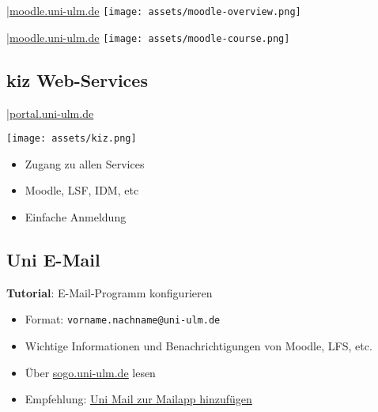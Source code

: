 \documentclass[
	aspectratio=169, 
	8pt 
]{beamer}
\begin{document}
\begin{frame}{\insertsubsection \space|\space\underline{\href{https://moodle.uni-ulm.de}{moodle.uni-ulm.de}}}
    \texttt{[image: assets/moodle-overview.png]}
\end{frame}

\begin{frame}{\insertsubsection \space|\space\underline{\href{https://moodle.uni-ulm.de}{moodle.uni-ulm.de}}}
    \texttt{[image: assets/moodle-course.png]}
\end{frame}


\subsection{kiz Web-Services}
\begin{frame}{\insertsubsection \space|\space\underline{\href{https://portal.uni-ulm.de}{portal.uni-ulm.de}}}
    \begin{fancycolumns}[widths={60}]
        \texttt{[image: assets/kiz.png]}
        \nextcolumn
        \begin{itemize}
            \item Zugang zu allen Services
            \item Moodle, LSF, IDM, etc
            \item Einfache Anmeldung 
        \end{itemize}
    \end{fancycolumns}
\end{frame}

\subsection{Uni E-Mail}
\begin{frame}{\insertsubsection}
    \begin{fancycolumns}[T, widths={30}]
        \begin{center}
            \textbf{Tutorial}: E-Mail-Programm konfigurieren
        \end{center}    
        \nextcolumn
        \begin{itemize}
            \item Format: \lstinline|vorname.nachname@uni-ulm.de|
            \item Wichtige Informationen und Benachrichtigungen von Moodle, LFS, etc.
            \item Über \underline{\href{https://sogo.uni-ulm.de}{sogo.uni-ulm.de}} lesen
            \item Empfehlung: \underline{\href{https://www.uni-ulm.de/einrichtungen/kiz/service-katalog/e-mail-kalender-zusammenarbeit/e-mail/e-mail-programme-konfigurieren/}{Uni Mail zur Mailapp hinzufügen}}
        \end{itemize}
    \end{fancycolumns}
\end{frame}
\end{document}
